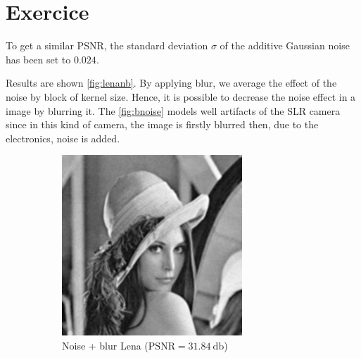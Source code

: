 \documentclass[12pt,english]{article}
\renewcommand{\thesection}{Exercice~\arabic{section}}
\begin{document}
\section[]{\thesection}
To get a similar PSNR, the standard deviation $\sigma$ of the additive Gaussian noise has been set to $0.024$.

Results are shown \autoref{fig:lenanb}. By applying blur, we average the effect of the noise by block of kernel size. Hence, it is possible to decrease the noise effect in a image by blurring it. The \autoref{fig:bnoise} models well artifacts of the SLR camera since in this kind of camera, the image is firstly blurred then, due to the electronics, noise is added.

\begin{figure}
	\centering
	\begin{subfigure}[t]{0.4\textwidth}
		\centering
		\includegraphics[width=.9\textwidth]{img/nblur}
		\caption{Noise + blur Lena ($\text{PSNR}=\SI{31.84}{\decibel}$)}
		\label{fig:nblur}
	\end{subfigure}%
	\qquad%
	\begin{subfigure}[t]{0.4\textwidth}
		\centering

\end{subfigure}
\end{figure}
\end{document}
